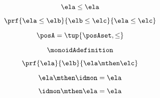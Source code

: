 {\begin{forslides}
        \begin{equation}
            \label{eq:semicats-slides-139}
            \ela \leq \ela
        \end{equation}

        \begin{equation}
            \label{eq:semicats-slides-140}
            \prf{
                \ela \leq \elb
            }{
                \elb \leq \elc
            }{
                \ela \leq \elc
            }
        \end{equation}

        \begin{equation}
            \label{eq:semicats-slides-141}
            \posA = \tup{\posAset, \leq}
        \end{equation}

        \begin{equation}
            \label{eq:semicats-slides-142}
            \monoidAdefinition
        \end{equation}

        \begin{equation}
            \label{eq:semicats-slides-143}
            \prf{
                \ela
            }{
                \elb
            }{
                \ela \mthen \elc
            }
        \end{equation}

        \begin{equation}
            \label{eq:semicats-slides-144}
            \ela \mthen \idmon = \ela
        \end{equation}

        \begin{equation}
            \label{eq:semicats-slides-145}
            \idmon \mthen \ela = \ela
        \end{equation}







\end{forslides}}
